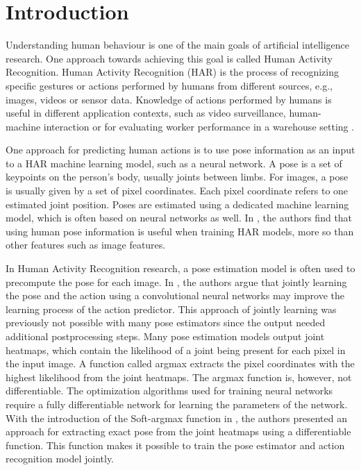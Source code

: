 \chapter{Introduction}

Understanding human behaviour is one of the main goals of artificial intelligence research.
One approach towards achieving this goal is called Human Activity Recognition.
Human Activity Recognition (HAR) is the process of recognizing specific gestures or actions performed by humans from different sources, e.g., images, videos or sensor data.
Knowledge of actions performed by humans is useful in different application contexts, such as video surveillance, human-machine interaction or
for evaluating worker performance in a warehouse setting \cite{reining_towards_2018}.

One approach for predicting human actions is to use pose information as an input to a HAR machine learning model, such as a neural network.
A pose is a set of keypoints on the person's body, usually joints between limbs.
For images, a pose is usually given by a set of pixel coordinates.
Each pixel coordinate refers to one estimated joint position.
Poses are estimated using a dedicated machine learning model, which is often based on neural networks as well.
In \cite{jhuang_towards_2013}, the authors find that using human pose information is useful when training HAR models, more so than other features such as image features.

In Human Activity Recognition research, a pose estimation model is often used to precompute the pose for each image.
In \cite{luvizon_2d/3d_2018}, the authors argue that jointly learning the pose and the action using a convolutional neural networks may improve the learning process of the action predictor.
This approach of jointly learning was previously not possible with many pose estimators since the output needed additional postprocessing steps.
Many pose estimation models output joint heatmaps, which contain the likelihood of a joint being present for each pixel in the input image.
A function called argmax extracts the pixel coordinates with the highest likelihood from the joint heatmaps.
The argmax function is, however, not differentiable.
The optimization algorithms used for training neural networks require a fully differentiable network for learning the parameters of the network.
With the introduction of the Soft-argmax function in \cite{luvizon_human_2017}, the authors presented an approach for extracting exact pose from the joint heatmaps using a differentiable function.
This function makes it possible to train the pose estimator and action recognition model jointly.

